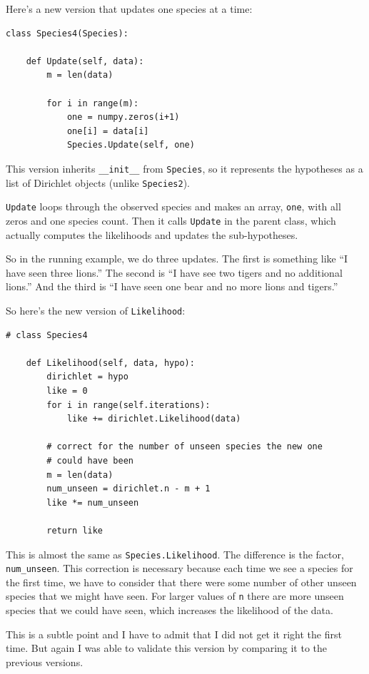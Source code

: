\documentclass[12pt]{book}
\begin{document}
Here's a new version that updates one species at a time:

\begin{verbatim}
class Species4(Species):

    def Update(self, data):
        m = len(data)

        for i in range(m):
            one = numpy.zeros(i+1)
            one[i] = data[i]            
            Species.Update(self, one)
\end{verbatim}

This version inherits \verb"__init__" from {\tt Species}, so it
represents the hypotheses as a list of Dirichlet objects (unlike
{\tt Species2}).

{\tt Update} loops through the observed species and makes an
array, {\tt one}, with all zeros and one species count.  Then
it calls {\tt Update} in the parent class, which actually computes
the likelihoods and updates the sub-hypotheses.

So in the running example, we do three updates.  The first
is something like ``I have seen three lions.''  The second is
``I have see two tigers and no additional lions.''  And the third
is ``I have seen one bear and no more lions and tigers.''

So here's the new version of {\tt Likelihood}:

\begin{verbatim}
# class Species4

    def Likelihood(self, data, hypo):
        dirichlet = hypo
        like = 0
        for i in range(self.iterations):
            like += dirichlet.Likelihood(data)

        # correct for the number of unseen species the new one
        # could have been
        m = len(data)
        num_unseen = dirichlet.n - m + 1
        like *= num_unseen

        return like
\end{verbatim}

This is almost the same as {\tt Species.Likelihood}.  The difference
is the factor, \verb"num_unseen".  This correction is necessary
because each time we see a species for the first time, we have to
consider that there were some number of other unseen species that
we might have seen.  For larger values of {\tt n} there are more
unseen species that we could have seen, which increases the likelihood
of the data.

This is a subtle point and I have to admit that I did not get it right
the first time.  But again I was able to validate this version
by comparing it to the previous versions.
\end{document}
